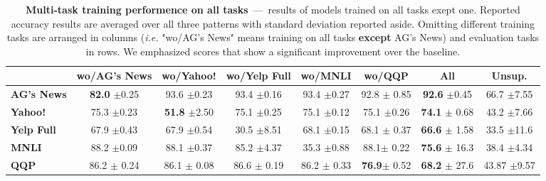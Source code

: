 \begin{table*}[ht]
	\centering
	\fontsize{9}{13}
	\selectfont
	\vspace{-1mm}
	\begin{tabular*}{\textwidth}{l@{\extracolsep{\fill}}ccccccc}
		\toprule
		& \textbf{wo/AG's News} & \textbf{wo/Yahoo!} & \textbf{wo/Yelp Full} & \textbf{wo/MNLI} & \textbf{wo/QQP} & \textbf{All} & \textbf{Unsup.} \\
		\hline
		\textbf{AG's News}    & \textbf{82.0} \tiny$\pm$0.25        & 93.6 \tiny$\pm$0.23        & 93.4   \tiny$\pm$0.16          & 93.4 \tiny$\pm$0.27       & 92.8 \tiny$\pm$ 0.85 & \textbf{92.6} \tiny$\pm$0.45 & 66.7 \tiny$\pm$7.55 \\
		\textbf{Yahoo!}     & 75.3 \tiny$\pm$0.23        & \textbf{51.8} \tiny$\pm$2.50        & 75.1   \tiny$\pm$0.25          & 75.1 \tiny$\pm$0.12       & 75.1 \tiny$\pm$0.26 & \textbf{74.1} \tiny$\pm$ 0.68  & 43.2 \tiny$\pm$7.66 \\
		\textbf{Yelp Full} & 67.9 \tiny$\pm$0.43        & 67.9 \tiny$\pm$0.54        & 30.5   \tiny$\pm$8.51          & 68.1 \tiny$\pm$0.15       & 68.1 \tiny$\pm$ 0.37 & \textbf{66.6} \tiny$\pm$ 1.58 & 33.5 \tiny$\pm$11.6 \\
		\textbf{MNLI}      & 88.2 \tiny$\pm$0.09        & 88.1 \tiny$\pm$0.37        & 85.2   \tiny$\pm$4.37          & 35.3 \tiny$\pm$0.88      & 88.1\tiny$\pm$ 0.22  & \textbf{75.6} \tiny$\pm$ 16.3 & 38.4 \tiny$\pm$4.34 \\
		\textbf{QQP}      &  86.2 \tiny$\pm$ 0.24        &  86.1 \tiny$\pm$ 0.08        &    86.6 \tiny$\pm$ 0.19          &  86.2 \tiny$\pm$ 0.33      & \textbf{76.9}\tiny$\pm$ 0.52  & \textbf{68.2} \tiny$\pm$ 27.6 & 43.87 \tiny$\pm$9.57\\
		\bottomrule
	\end{tabular*}
	\caption{\textbf{Multi-task training performence on all tasks}~---~results of models trained on all tasks exept one. Reported accuracy results are averaged over all three patterns with standard deviation reported aside. Omitting different training tasks are arranged in columns (\textit{i.e.} "wo/AG's News" means training on all tasks \textbf{except} AG's News) and evaluation tasks in rows. We emphasized scores that show a significant improvement over the baseline.}\label{tab:multi-on-train-set-summary}
	\vspace{-5mm}
\end{table*}
